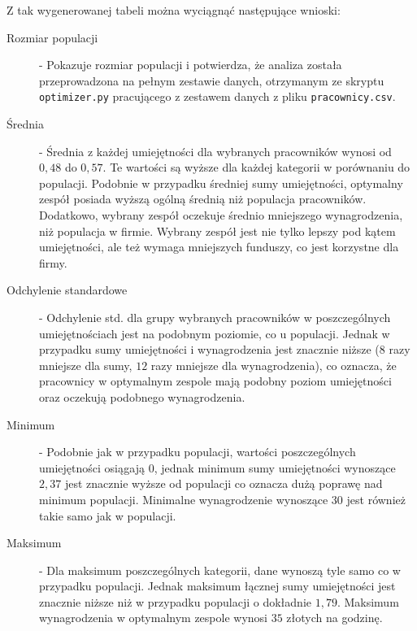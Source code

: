     \par Z tak wygenerowanej tabeli można wyciągnąć następujące wnioski:
    \begin{description}
        \item[Rozmiar populacji\label{itm:count_2}]  - Pokazuje rozmiar populacji i potwierdza, że analiza została przeprowadzona na pełnym zestawie danych, otrzymanym ze skryptu \verb|optimizer.py| pracującego z zestawem danych z pliku \verb|pracownicy.csv|.
        
        \item[Średnia\label{itm:mean_2}] - Średnia z każdej umiejętności dla wybranych pracowników wynosi od $0,48$ do $0,57$. Te wartości są wyższe dla każdej kategorii w porównaniu do populacji. Podobnie w przypadku średniej sumy umiejętności, optymalny zespół posiada wyższą ogólną średnią niż populacja pracowników. Dodatkowo, wybrany zespół oczekuje średnio mniejszego wynagrodzenia, niż populacja w firmie. Wybrany zespół jest nie tylko lepszy pod kątem umiejętności, ale też wymaga mniejszych funduszy, co jest korzystne dla firmy.
        
        \item[Odchylenie standardowe\label{itm:std_2}] - Odchylenie std. dla grupy wybranych pracowników w poszczególnych umiejętnościach jest na podobnym poziomie, co u populacji. Jednak w przypadku sumy umiejętności i wynagrodzenia jest znacznie niższe ($8$ razy mniejsze dla sumy, $12$ razy mniejsze dla wynagrodzenia), co oznacza, że pracownicy w optymalnym zespole mają podobny poziom umiejętności oraz oczekują podobnego wynagrodzenia.
        
        \item[Minimum\label{itm:min_2}] - Podobnie jak w przypadku populacji, wartości poszczególnych umiejętności osiągają $0$, jednak minimum sumy umiejętności wynoszące $2,37$ jest znacznie wyższe od populacji co oznacza dużą poprawę nad minimum populacji. Minimalne wynagrodzenie wynoszące $30$ jest również takie samo jak w populacji.
        
        \item[Maksimum\label{itm:max_2}] - Dla maksimum poszczególnych kategorii, dane wynoszą tyle samo co w przypadku populacji. Jednak maksimum łącznej sumy umiejętności jest znacznie niższe niż w przypadku populacji o dokładnie $1,79$. Maksimum wynagrodzenia w optymalnym zespole wynosi $35$ złotych na godzinę.
        

\end{description}
